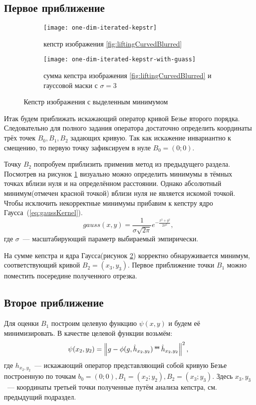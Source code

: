 \subsection{Первое приближение}
\begin{figure}[h!]
	\begin{subfigure}[t]{0.5\textwidth}
		\texttt{[image: one-dim-iterated-kepstr]}
		\caption{кепстр изображения \ref{fig:liftingCurvedBlurred}}
		\label{fig:curvedKepstrUnmodified}
	\end{subfigure}
	\begin{subfigure}[t]{0.5\textwidth}
		\texttt{[image: one-dim-iterated-kepstr-with-guass]}
		\caption{сумма кепстра изображения \ref{fig:liftingCurvedBlurred} и гауссовой маски с $\sigma=3$}
		\label{fig:curvedKepstrWithGauss}
	\end{subfigure}
	\caption{Кепстр изображения с выделенным минимумом}
	\label{fig:}
\end{figure}
Итак будем приближать искажающий оператор кривой Безье второго порядка. Следовательно для полного задания оператора достаточно определить координаты трёх точек $B_0, B_1, B_2$ задающих кривую. Так как искажение инвариантно к смещению, то первую точку зафиксируем в нуле $B_0 = (0;0)$.

Точку $B_2$ попробуем приблизить применив метод из предыдущего раздела. Посмотрев на рисунок \ref{fig:curvedKepstrUnmodified} визуально можно определить минимумы в тёмных точках вблизи нуля и на определённом расстоянии. Однако абсолютный минимум(отмечен красной точкой) вблизи нуля не является искомой точкой. Чтобы исключить некорректные минимумы прибавим к кепстру ядро Гаусса~(\ref{eq:gaussKernel}).
\begin{equation}\label{eq:gaussKernel}
	gauss(x,y) = \frac{1}{\sigma\sqrt{2\pi}}e^{-\frac{x^2+y^2}{2\sigma^2}},
\end{equation}
где $\sigma$~--- масштабирующий параметр выбираемый эмпирически.

На сумме кепстра и ядра Гаусса(рисунок \ref{fig:curvedKepstrWithGauss}) корректно обнаруживается минимум, соответствующий кривой $B_2=(x_3,y_3)$. Первое приближение точки $B_1$ можно поместить посередине полученного отрезка.

\subsection{Второе приближение}
Для оценки $B_1$ построим целевую функцию $\psi(x,y)$ и будем её минимизировать. В качестве целевой функции возьмём:
\begin{equation}\label{eq:costFunction}
	\psi(x_2,y_2) = \left\|g - \phi(g, \hat{h}_{x_2,y_2}) \operatorname*{*\!*} \hat{h}_{x_2,y_2}\right\|^2,
\end{equation}
где $h_{x_2,y_2}$~--- искажающий оператор представляющий собой кривую Безье построенную по точкам $b_0=(0;0), B_1=(x_2;y_2), B_2=(x_3;y_3)$. Здесь $x_3, y_3$~--- координаты третьей точки полученные путём анализа кепстра, см. предыдущий подраздел.

